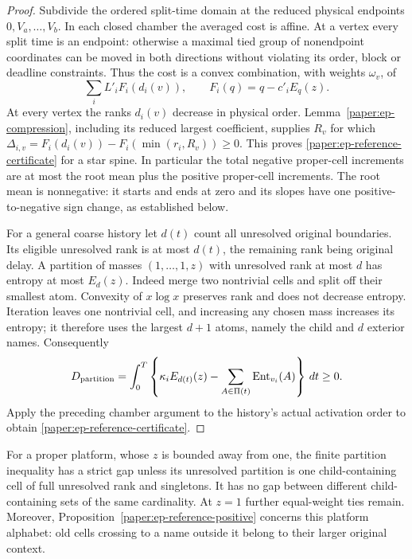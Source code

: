 \begin{proof}
Subdivide the ordered split-time domain at the reduced physical
endpoints $0,V_a,\ldots,V_b$.  In each closed chamber the averaged
cost is affine.  At a vertex every split time is an endpoint: otherwise
a maximal tied group of nonendpoint coordinates can be moved in both
directions without violating its order, block or deadline constraints.
Thus the cost is a convex combination, with weights $\omega_v$, of
\[
 \sum_iL'_iF_i(d_i(v)),\qquad F_i(q)=q-c'_iE_q(z).
\]
At every vertex the ranks $d_i(v)$ decrease in physical order.
Lemma~\ref{paper:ep-compression}, including its reduced largest
coefficient, supplies $R_v$ for which
$\Delta_{i,v}=F_i(d_i(v))-F_i(\min(r_i,R_v))\geq0$.
This proves \eqref{paper:ep-reference-certificate} for a star spine.
In particular the total negative proper-cell increments are at most
the root mean plus the positive proper-cell increments.  The root
mean is nonnegative: it starts and ends at zero and its slopes have
one positive-to-negative sign change, as established below.

For a general coarse history let $d(t)$ count all unresolved original
boundaries.  Its eligible unresolved rank is at most $d(t)$, the
remaining rank being original delay.  A partition of masses
$(1,\ldots,1,z)$ with unresolved rank at most $d$ has entropy at most
$E_d(z)$.  Indeed merge two nontrivial cells and split off their smallest
atom.  Convexity of $x\log x$ preserves rank and does not decrease
entropy.  Iteration leaves one nontrivial cell, and increasing any
chosen mass increases its entropy; it therefore uses the largest
$d+1$ atoms, namely the child and $d$ exterior names.  Consequently
\[
 D_{\rm partition}=\int_0^T\left\{\kappa_iE_{d(t)}(z)
             -\sum_{A\in\Pi(t)}\operatorname{Ent}_{v_i}(A)\right\}\,dt\geq0.
\]
Apply the preceding chamber argument to the history's actual activation
order to obtain \eqref{paper:ep-reference-certificate}.
\end{proof}
For a proper platform, whose $z$ is bounded away from one, the finite
partition inequality has a strict gap unless its unresolved partition
is one child-containing cell of full unresolved rank and singletons.
It has no gap between different child-containing sets of the same
cardinality.  At $z=1$ further equal-weight ties remain.  Moreover,
Proposition~\ref{paper:ep-reference-positive} concerns this platform
alphabet: old cells crossing to a name outside it belong to their
larger original context.

